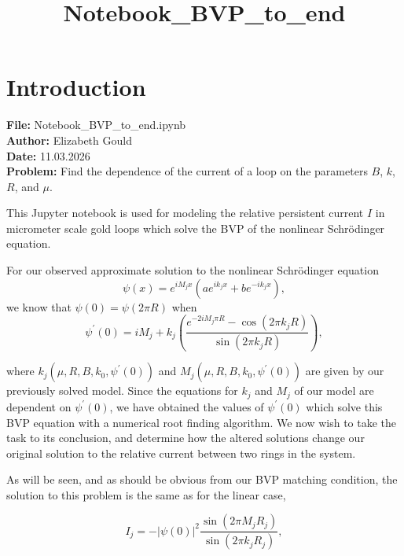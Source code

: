 \documentclass[11pt]{article}
\title{Notebook\_BVP\_to\_end}
\begin{document}
    
    \maketitle
    
    

    
    \hypertarget{introduction}{%
\section{Introduction}\label{introduction}}

    \textbf{File:} Notebook\_BVP\_to\_end.ipynb\\
\textbf{Author:} Elizabeth Gould\\
\textbf{Date:} 11.03.2026\\
\textbf{Problem:} Find the dependence of the current of a loop on the
parameters \(B\), \(k\), \(R\), and \(\mu\).

    This Jupyter notebook is used for modeling the relative persistent
current \(I\) in micrometer scale gold loops which solve the BVP of the
nonlinear Schrödinger equation.

For our observed approximate solution to the nonlinear Schrödinger
equation \begin{equation}
\psi(x) = e^{i M_{j} x} \left( a e^{i k_{j} x} + b e^{- i k_{j} x} \right),
\end{equation} we know that \(\psi(0) = \psi(2\pi R)\) when
\begin{equation}
\psi^\prime(0) = i M_{j} + k_j \left( \frac{e^{- 2 i M_{j}\pi R} - \cos\left( 2\pi k_{j} R \right)}{\sin\left(2\pi k_{j} R\right)}\right),
\end{equation}

where \(k_{j}\left(\mu, R, B, k_0, \psi^\prime(0) \right)\) and
\(M_{j}\left(\mu, R, B, k_0, \psi^\prime(0) \right)\) are given by our
previously solved model. Since the equations for \(k_j\) and \(M_j\) of
our model are dependent on \(\psi^\prime(0)\), we have obtained the
values of \(\psi^\prime(0)\) which solve this BVP equation with a
numerical root finding algorithm. We now wish to take the task to its
conclusion, and determine how the altered solutions change our original
solution to the relative current between two rings in the system.

    As will be seen, and as should be obvious from our BVP matching
condition, the solution to this problem is the same as for the linear
case,

\begin{equation}
I_j = - \left| \psi(0) \right|^2 \frac{\sin\left(2 \pi M_j R_j\right)}{\sin\left(2 \pi k_j R_j\right)},
\end{equation}
\end{document}
